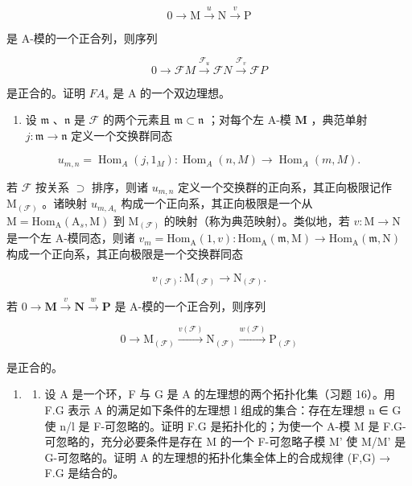 \[
0 \longrightarrow \mathrm{M} \stackrel {u} {\longrightarrow} \mathrm{N} \stackrel {v} {\longrightarrow} \mathrm{P}
\]

是 A-模的一个正合列，则序列

\[
0 \longrightarrow \mathcal {F} M \stackrel {\mathcal {F} _ {u}} {\longrightarrow} \mathcal {F} N \stackrel {\mathcal {F} _ {v}} {\longrightarrow} \mathcal {F} P
\]

是正合的。证明 \(FA_{s}\) 是 A 的一个双边理想。

\begin{enumerate}
\def\labelenumi{(\alph{enumi})}
\setcounter{enumi}{2}
\tightlist
\item
  设 \(\mathfrak{m}\) 、\(\mathfrak{n}\) 是 \(\mathcal{F}\) 的两个元素且 \(\mathfrak{m} \subset \mathfrak{n}\) ；对每个左 A-模 \(\mathbf{M}\) ，典范单射 \(j \colon \mathfrak{m} \to \mathfrak{n}\) 定义一个交换群同态
\end{enumerate}

\[
u _ {m, n} = \operatorname{Hom} _ {A} (j, 1 _ {M}): \operatorname{Hom} _ {A} (n, M) \rightarrow \operatorname{Hom} _ {A} (m, M).
\]

若 \(\mathcal{F}\) 按关系 \(\supset\) 排序，则诸 \(u_{m,n}\) 定义一个交换群的正向系，其正向极限记作 \(\mathrm{M}_{(\mathcal{F})}\) 。诸映射 \(u_{m,A_s}\) 构成一个正向系，其正向极限是一个从 \(\mathrm{M} = \mathrm{Hom}_{\mathrm{A}}(\mathrm{A}_s,\mathrm{M})\) 到 \(\mathrm{M}_{(\mathcal{F})}\) 的映射（称为典范映射）。类似地，若 \(v: \mathrm{M} \to \mathrm{N}\) 是一个左 A-模同态，则诸 \(v_m = \mathrm{Hom}_{\mathrm{A}}(1,v): \mathrm{Hom}_{\mathrm{A}}(\mathfrak{m},\mathrm{M}) \to \mathrm{Hom}_{\mathrm{A}}(\mathfrak{m},\mathrm{N})\) 构成一个正向系，其正向极限是一个交换群同态

\[
v _ {(\mathcal {F})} \colon \mathrm{M} _ {(\mathcal {F})} \rightarrow \mathrm{N} _ {(\mathcal {F})}.
\]

若 \(0 \to \mathbf{M} \xrightarrow{v} \mathbf{N} \xrightarrow{w} \mathbf{P}\) 是 A-模的一个正合列，则序列

\[
0 \longrightarrow \mathrm{M} _ {(\mathcal {F})} \stackrel {v (\mathcal {F})} {\longrightarrow} \mathrm{N} _ {(\mathcal {F})} \stackrel {w (\mathcal {F})} {\longrightarrow} \mathrm{P} _ {(\mathcal {F})}
\]

是正合的。

\begin{enumerate}
\def\labelenumi{\arabic{enumi}.}
\setcounter{enumi}{17}
\tightlist
\item
  \begin{enumerate}
  \def\labelenumii{(\alph{enumii})}
  \tightlist
  \item
    设 A 是一个环，F 与 G 是 A 的左理想的两个拓扑化集（习题 16）。用 F.G 表示 A 的满足如下条件的左理想 l 组成的集合：存在左理想 n ∈ G 使 n/l 是 F-可忽略的。证明 F.G 是拓扑化的；为使一个 A-模 M 是 F.G-可忽略的，充分必要条件是存在 M 的一个 F-可忽略子模 M' 使 M/M' 是 G-可忽略的。证明 A 的左理想的拓扑化集全体上的合成规律 (F,G) → F.G 是结合的。
  \end{enumerate}
\end{enumerate}

